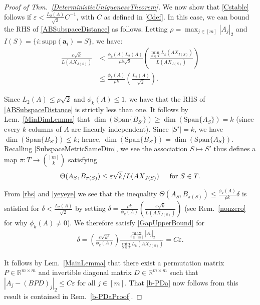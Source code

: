 \documentclass[journal, twocolumn]{IEEEtran}
\begin{document}
\begin{proof}[Proof of Thm.~\ref{DeterministicUniquenessTheorem}]
We now show that \eqref{Cstable} follows if $\varepsilon < \frac{L_2(A)}{\sqrt{2}}C^{-1}$, with $C$ as defined in \eqref{Cdef}. In this case, we can bound the RHS of \eqref {ABSubspaceDistance} as follows. Letting $\rho = \max_{j \in [m]} |A_j|_2$ and $I(S) = \{i: \text{supp}(\mathbf{a}_i)=S\}$, we have:
\begin{align}\label{rhs}
\frac{\varepsilon\sqrt{k}}{L(AX_{J(S)})} 
&<  \frac{\phi_k(A) L_2(A)}{\rho k \sqrt{2}} \left( \frac{\min_{S \in T}L_k(AX_{I(S)})}{L(AX_{J(S)})} \right) \nonumber \\
&\leq \frac{\phi_k(A)}{\rho k} \left( \frac{L_2(A)}{\sqrt{2}} \right).
\end{align}

Since $L_2(A) \leq \rho \sqrt{2}$ and $\phi_k(A) \leq 1$, we have that the RHS of \eqref{ABSubspaceDistance} is strictly less than one. It follows by Lem.~\ref{MinDimLemma} that $\dim(\text{Span}\{B_{S'}\}) \geq \dim(\text{Span}\{A_{S}\}) = k$ (since every $k$ columns of $A$ are linearly independent). Since $|S'| = k$, we have $\dim(\text{Span}\{B_{S'}\}) \leq k$; hence, $\dim(\text{Span}\{B_{S'}\}) = \dim(\text{Span}\{A_{S}\})$. Recalling \eqref{SubspaceMetricSameDim},  we see the association $S \mapsto S'$ thus defines a map $\pi: T \to {[m] \choose k}$ satisfying
\begin{align}\label{yeyeye}
\Theta(A_{S}, B_{\pi(S)}) \leq \varepsilon\sqrt{k} / L(AX_{J(S)}) \indent \text{for } S \in T.
\end{align}

From \eqref{rhs} and \eqref{yeyeye} we see that the inequality $\Theta(A_{S}, B_{\pi(S)}) \leq \frac{ \phi_k(A) }{\rho k} \delta$ is satisfied for $\delta < \frac{L_2(A)}{\sqrt{2}}$ by setting $\delta = \frac{ \rho k}{ \phi_k(A) } \left(  \frac{\varepsilon \sqrt{k}}{L(AX_{J(S)})} \right)$ (see Rem.~\ref{nonzero} for why $\phi_k(A) \neq 0$). We therefore satisfy \eqref{GapUpperBound} for 
\begin{align*}
\delta = \left( \frac{ \varepsilon \sqrt{k^3}}{ \phi_k(A) } \right) \frac{\max_{j \in [m]} |A_j|_2}{\min_{S \in T} L_k(AX_{I(S)})}
= C\varepsilon.
\end{align*}

It follows by Lem.~\ref{MainLemma} that there exist a permutation matrix $P \in \mathbb{R}^{m \times m}$ and invertible diagonal matrix $D \in \mathbb{R}^{m \times m}$ such that $|A_j - (BPD)_j|_2 \leq C\varepsilon$ for all $j \in [m]$. That \eqref{b-PDa} now follows from this result is contained in Rem.~\ref{b-PDaProof}.
\end{proof}
\end{document}
